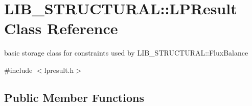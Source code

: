 \hypertarget{class_l_i_b___s_t_r_u_c_t_u_r_a_l_1_1_l_p_result}{}\section{L\+I\+B\+\_\+\+S\+T\+R\+U\+C\+T\+U\+R\+AL\+:\+:L\+P\+Result Class Reference}
\label{class_l_i_b___s_t_r_u_c_t_u_r_a_l_1_1_l_p_result}


basic storage class for constraints used by L\+I\+B\+\_\+\+S\+T\+R\+U\+C\+T\+U\+R\+A\+L\+::\+Flux\+Balance  




{\ttfamily \#include $<$lpresult.\+h$>$}

\subsection*{Public Member Functions}

